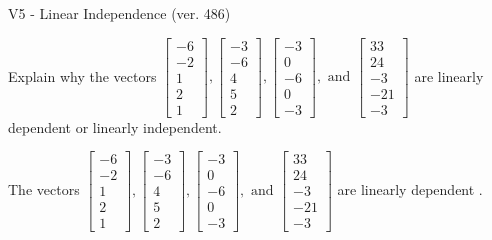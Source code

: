 \begin{exercise}
  \begin{exerciseTitle}V5 - Linear Independence (ver. 486)\end{exerciseTitle}
  \begin{exerciseStatement}
    Explain why the vectors \(\left[\begin{array}{r}
-6 \\
-2 \\
1 \\
2 \\
1
\end{array}\right] , \left[\begin{array}{r}
-3 \\
-6 \\
4 \\
5 \\
2
\end{array}\right] , \left[\begin{array}{r}
-3 \\
0 \\
-6 \\
0 \\
-3
\end{array}\right] , \text{ and } \left[\begin{array}{r}
33 \\
24 \\
-3 \\
-21 \\
-3
\end{array}\right]\) are linearly dependent or linearly independent.	


  \end{exerciseStatement}
  \begin{exerciseAnswer}
   The vectors \(\left[\begin{array}{r}
-6 \\
-2 \\
1 \\
2 \\
1
\end{array}\right] , \left[\begin{array}{r}
-3 \\
-6 \\
4 \\
5 \\
2
\end{array}\right] , \left[\begin{array}{r}
-3 \\
0 \\
-6 \\
0 \\
-3
\end{array}\right] , \text{ and } \left[\begin{array}{r}
33 \\
24 \\
-3 \\
-21 \\
-3
\end{array}\right]\) are 
  	 linearly dependent  .
  


  \end{exerciseAnswer}
\end{exercise}